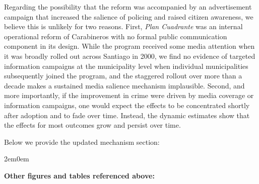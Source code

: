 Regarding the possibility that the reform was accompanied by an advertisement campaign that increased the salience of policing and raised citizen awareness, we believe this is unlikely for two reasons. First, \emph{Plan Cuadrante} was an internal operational reform of Carabineros with no formal public communication component in its design. While the program received some media attention when it was broadly rolled out across Santiago in 2000, we find no evidence of targeted information campaigns at the municipality level when individual municipalities subsequently joined the program, and the staggered rollout over more than a decade makes a sustained media salience mechanism implausible. Second, and more importantly, if the improvement in crime were driven by media coverage or information campaigns, one would expect the effects to be concentrated shortly after adoption and to fade over time. Instead, the dynamic estimates show that the effects for most outcomes grow and persist over time.


Below we provide the updated mechanism section:

\begin{adjustwidth}{2em}{0em}
{\setcounter{figure}{3}\renewcommand{\thefigure}{\arabic{figure}}
}
\end{adjustwidth}

\clearpage
\noindent\textbf{Other figures and tables referenced above:}
\vspace{0.5em}

{\setcounter{figure}{1}\renewcommand{\thefigure}{\arabic{figure}}
}

\clearpage

{\renewcommand{\thetable}{B.3}
}

\clearpage

{\renewcommand{\thefigure}{B.3}
}

\clearpage

{\renewcommand{\thefigure}{B.4}
}

\clearpage

{\renewcommand{\thefigure}{B.5}
}

\clearpage

{\renewcommand{\thetable}{B.4}
}

\clearpage

{\renewcommand{\thefigure}{B.6}
}

\clearpage

{\renewcommand{\thefigure}{C.8}
}

\clearpage


